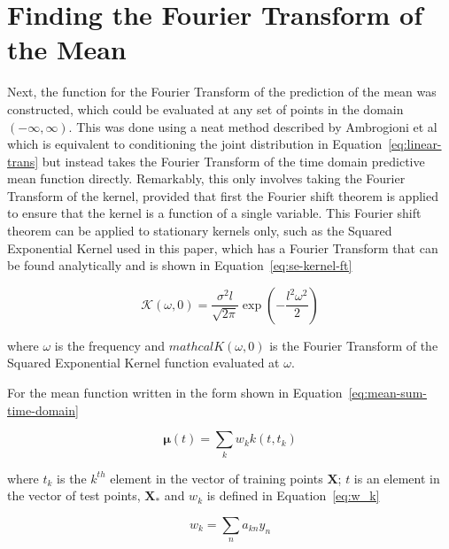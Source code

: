 \documentclass[12pt]{article}
\begin{document}
    \section{Finding the Fourier Transform of the Mean}
    Next, the function for the Fourier Transform of the prediction of the mean was constructed, which could be evaluated at any set of points in the domain $(-\infty, \infty)$.
    This was done using a neat method described by Ambrogioni et al~\cite{Ambrogioni2018} which is equivalent to conditioning the joint distribution in Equation~\ref{eq:linear-trans} but instead takes the Fourier Transform of the time domain predictive mean function directly.
    Remarkably, this only involves taking the Fourier Transform of the kernel, provided that first the Fourier shift theorem is applied to ensure that the kernel is a function of a single variable.
    This Fourier shift theorem can be applied to stationary kernels only, such as the Squared Exponential Kernel used in this paper, which has a Fourier Transform that can be found analytically and is shown in Equation~\ref{eq:se-kernel-ft}

    \begin{equation}
        \mathcal{K}(\omega,0) = \frac{\sigma^2 l}{\sqrt{2 \pi}} \exp\left(-\frac{l^2 \omega^2}{2}\right) \label{eq:se-kernel-ft}
    \end{equation}

    \noindent where $\omega$ is the frequency and $mathcal{K}(\omega,0)$ is the Fourier Transform of the Squared Exponential Kernel function evaluated at $\omega$.

    For the mean function written in the form shown in Equation~\ref{eq:mean-sum-time-domain}

    \begin{equation}
        \mathbf{\mu}(t) = \sum_{k} w_k k(t,t_k) \label{eq:mean-sum-time-domain}
    \end{equation}

    \noindent where $t_k$ is the $k^{th}$ element in the vector of training points $\mathbf{X}$; $t$ is an element in the vector of test points, $\mathbf{X}_*$ and $w_k$ is defined in Equation~\ref{eq:w_k}

    \begin{equation}
        w_k = \sum_{n} a_{kn} y_n \label{eq:w_k}
    \end{equation}
\end{document}
